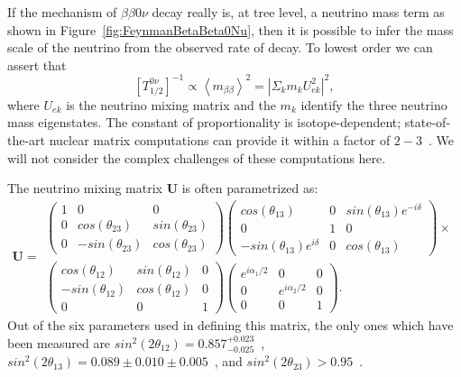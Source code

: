 If the mechanism of $\beta\beta 0\nu$ decay really is, at tree level, a neutrino mass term as shown in Figure~\ref{fig:FeynmanBetaBeta0Nu}, then it is possible to infer the mass scale of the neutrino from the observed rate of decay.  To lowest order we can assert that
\begin{equation} \label{eq:DestructiveMassInteraction}
\left[T^{0\nu}_{1/2}\right]^{-1} \propto \left< m_{\beta\beta} \right>^2 = \left|\Sigma_k m_k U_{ek}^2\right|^2,
\end{equation}
where $U_{ek}$ is the neutrino mixing matrix and the $m_k$ identify the three neutrino mass eigenstates.  The constant of proportionality is isotope-dependent; state-of-the-art nuclear matrix computations can provide it within a factor of $2-3$~\cite{RMPbb0n}.  We will not consider the complex challenges of these computations here.

The neutrino mixing matrix $\mathbf{U}$ is often parametrized as:
\begin{equation}
\mathbf{U} =
\begin{aligned}
\begin{pmatrix}
1 & 0 & 0 \\
0 & cos(\theta_{23}) & sin(\theta_{23}) \\
0 & -sin(\theta_{23}) & cos(\theta_{23})
\end{pmatrix}
\begin{pmatrix}
cos(\theta_{13}) & 0 & sin(\theta_{13})e^{-i\delta} \\
0 & 1 & 0 \\
-sin(\theta_{13})e^{i\delta} & 0 & cos(\theta_{13})
\end{pmatrix} \times \\
\begin{pmatrix}
cos(\theta_{12}) & sin(\theta_{12}) & 0 \\
-sin(\theta_{12}) & cos(\theta_{12}) & 0 \\
0 & 0 & 1
\end{pmatrix}
\begin{pmatrix}
e^{i\alpha_1/2} & 0 & 0 \\
0 & e^{i\alpha_2/2} & 0 \\
0 & 0 & 1
\end{pmatrix}.
\end{aligned}
\end{equation}
Out of the six parameters used in defining this matrix, the only ones which have been measured are $sin^2(2\theta_{12}) = 0.857^{+0.023}_{-0.025}$~\cite{PhysRevD.83.052002}, $sin^2(2\theta_{13}) = 0.089 \pm 0.010 \pm 0.005$~\cite{1674-1137-37-1-011001}, and $sin^2(2\theta_{23}) > 0.95$~\cite{PhysRevLett.107.241801}.

